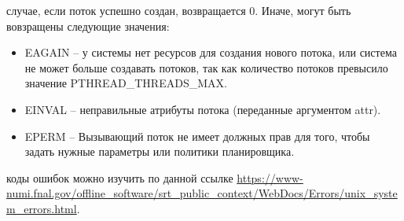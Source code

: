 {	 случае, если поток успешно создан, возвращается 0. Иначе, могут быть вовзращены следующие значения:
	\begin{itemize}
	    \item EAGAIN – у системы нет ресурсов для создания нового потока, или система не может больше создавать потоков, так как количество потоков превысило значение PTHREAD\_THREADS\_MAX.
	    \item EINVAL – неправильные атрибуты потока (переданные аргументом attr).
	    \item EPERM – Вызывающий поток не имеет должных прав для того, чтобы задать нужные параметры или политики планировщика.
	\end{itemize}
	 коды ошибок можно изучить по данной ссылке \url{https://www-numi.fnal.gov/offline_software/srt_public_context/WebDocs/Errors/unix_system_errors.html}.
	
}
